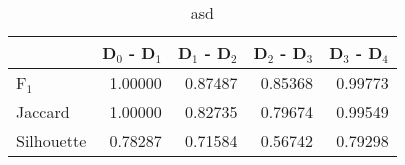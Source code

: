 \begin{table}
\centering
\caption{asd}
\label{tab:s1-orig-eca-combined}
\begin{tabular}{lrrrr}
\toprule
{} &  D$_0$ - D$_1$ &  D$_1$ - D$_2$ &  D$_2$ - D$_3$ &  D$_3$ - D$_4$ \\
\midrule
F$_1$      &        1.00000 &        0.87487 &        0.85368 &        0.99773 \\
Jaccard    &        1.00000 &        0.82735 &        0.79674 &        0.99549 \\
Silhouette &        0.78287 &        0.71584 &        0.56742 &        0.79298 \\
\bottomrule
\end{tabular}
\end{table}
